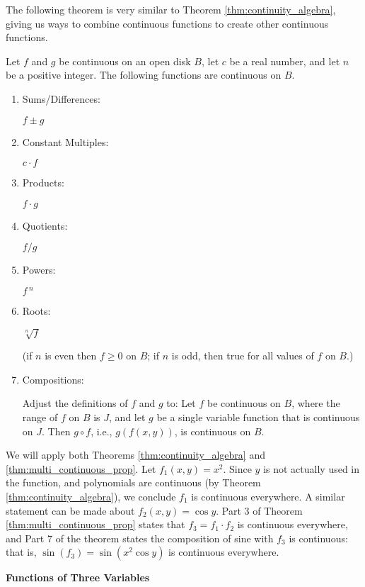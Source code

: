 The following theorem is very similar to Theorem \ref{thm:continuity_algebra}, giving us ways to combine continuous functions to create other continuous functions.

{Let $f$ and $g$ be continuous on an open disk $B$, let $c$ be a real number, and let $n$ be a positive integer. The following functions are continuous on $B$.
		\begin{enumerate}
		\item		\parbox{80pt}{Sums/Differences:}	$f\pm g$
		\item		\parbox{80pt}{Constant Multiples:}	$c\cdot f$
		\item		\parbox{80pt}{Products:}	$f\cdot g$
		\item		\parbox{80pt}{Quotients:}	$f/g$ 
		\item		\parbox{80pt}{Powers:}	$f\,^n$
		\item		\parbox{80pt}{Roots:}	$\sqrt[n]{f}$ \qquad \parbox[t]{150pt}{\small (if $n$ is even then $f\geq 0$ on $B$; if $n$ is odd, then true for all values of $f$ on $B$.)}
		\item		\parbox{80pt}{Compositions:}\parbox[t]{185pt}{Adjust the definitions of $f$ and $g$ to: Let $f$ be continuous on $B$, where the range of $f$ on $B$ is $J$, and let $g$ be a single variable function that is continuous on $J$. Then $g\circ f$, i.e., $g(f(x,y))$, is continuous on $B$.}
		\end{enumerate}
}
\enlargethispage{\baselineskip}

{We will apply both Theorems \ref{thm:continuity_algebra} and \ref{thm:multi_continuous_prop}. Let $f_1(x,y) = x^2$. Since $y$ is not actually used in the function, and polynomials are continuous (by Theorem \ref{thm:continuity_algebra}), we conclude $f_1$ is continuous everywhere. A similar statement can be made about $f_2(x,y) = \cos y$. Part 3 of Theorem \ref{thm:multi_continuous_prop} states that $f_3=f_1\cdot f_2$ is continuous everywhere, and Part 7 of the theorem states the composition of sine with $f_3$ is continuous: that is, $\sin (f_3) = \sin(x^2\cos y)$ is continuous everywhere.
}\\
\pagebreak

\noindent\textbf{\large Functions of Three Variables}\\

